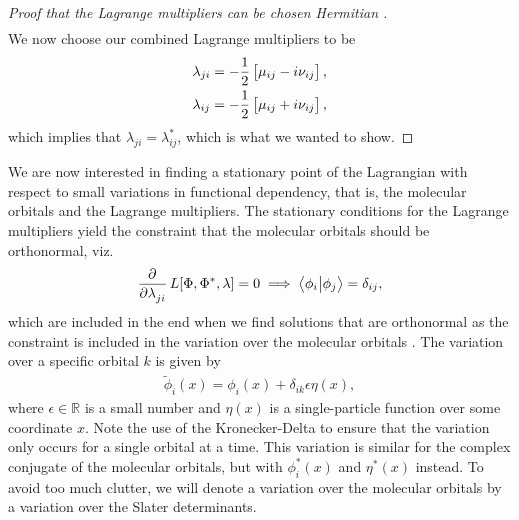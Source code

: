 \begin{proof}[%
                    Proof that the Lagrange multipliers can be chosen Hermitian%
                ]
\begin{align}
                \end{align}
                We now choose our combined Lagrange multipliers to be
                \begin{align}
                    \lambda_{ji} &=
                    -\frac{1}{2}\left[ 
                        \mu_{ij} - i\nu_{ij}
                     \right], \\
                    \lambda_{ij} &=
                    -\frac{1}{2}\left[ 
                        \mu_{ij} + i\nu_{ij}
                     \right],
                \end{align}
                which implies that $\lambda_{ji} = \lambda_{ij}^{*}$, which is
                what we wanted to show.
            \end{proof}

            We are now interested in finding a stationary point of the
            Lagrangian with respect to small variations in functional
            dependency, that is, the molecular orbitals and the Lagrange
            multipliers.
            The stationary conditions for the Lagrange multipliers yield the
            constraint that the molecular orbitals should be orthonormal, viz.
            \begin{gather}
                \dpd{}{\lambda_{ji}}\lagrangianfunc{\slat, \slat^{*}, \lambda}
                = 0
                \implies
                \braket{\phi_i}{\phi_j} = \delta_{ij},
            \end{gather}
            which are included in the end when we find solutions that are
            orthonormal as the constraint is included in the variation over the
            molecular orbitals \cite{kvaal2017notes}.
            The variation over a specific orbital $k$ is given by
            \begin{align}
                \tilde{\phi}_i(x) = \phi_{i}(x) + \delta_{ik}\epsilon\eta(x),
            \end{align}
            where $\epsilon \in \mathbb{R}$ is a small number and $\eta(x)$ is a
            single-particle function over some coordinate $x$.
            Note the use of the Kronecker-Delta to ensure that the variation
            only occurs for a single orbital at a time.
            This variation is similar for the complex conjugate of the
            molecular orbitals, but with $\phi^{*}_i(x)$ and $\eta^{*}(x)$
            instead.
            To avoid too much clutter, we will denote a variation over the
            molecular orbitals by a variation over the Slater determinants.
